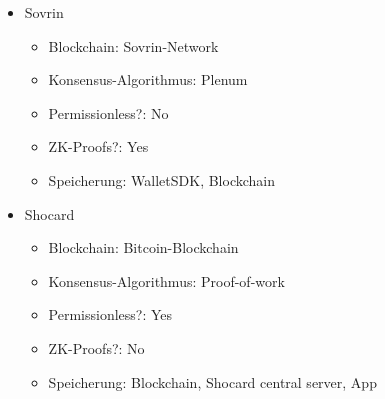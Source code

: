 \begin{itemize}
	\item Sovrin
	\begin{itemize}
		\item Blockchain: Sovrin-Network
		\item Konsensus-Algorithmus: Plenum
		\item Permissionless?: No
		\item ZK-Proofs?: Yes
		\item Speicherung: WalletSDK, Blockchain
	\end{itemize}
	\newpage
	\item Shocard
	\begin{itemize}
		\item Blockchain: Bitcoin-Blockchain
		\item Konsensus-Algorithmus: Proof-of-work
		\item Permissionless?: Yes
		\item ZK-Proofs?: No
		\item Speicherung: Blockchain, Shocard central server, App
	\end{itemize}
\end{itemize}



